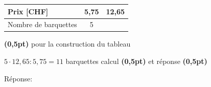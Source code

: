 \begin{parts}
\begin{solutionorgrid}[190pt]
\vspace{5pt}
\def\arraystretch{1.5}
\begin{tabularx}{0.5\textwidth}{l|C|C|}
Prix [CHF]&5,75&12,65\\
\hline
Nombre de barquettes&5&\\
\end{tabularx}
\def\arraystretch{1.5}

\hfill\textbf{(0,5pt)} pour la construction du tableau

\vspace{15pt}$5 \cdot 12,65 : 5,75 = 11$ barquettes \hfill calcul \textbf{(0,5pt)} et réponse \textbf{(0,5pt)}

\end{solutionorgrid}

\begin{tcolorbox}[enhanced jigsaw, interior hidden, colframe=box, parbox=false]%
Réponse: 
\end{tcolorbox}
\end{parts}


